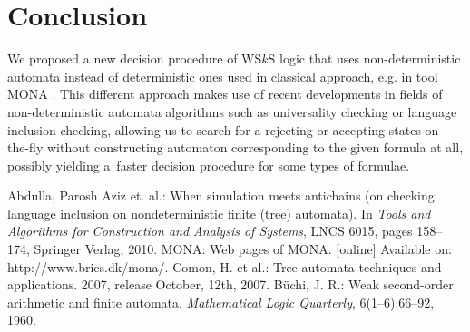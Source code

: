 \documentclass{eeict}
\begin{document}
\section{Conclusion}

We proposed a new decision procedure of WS$k$S logic that uses non-deterministic
automata instead of deterministic ones used in classical approach, e.g. in tool
MONA \cite{mona}. This different approach makes use of recent developments in
fields of non-deterministic automata algorithms such as universality checking or
language inclusion checking, allowing us to search for a rejecting or accepting
states on-the-fly without constructing automaton corresponding to the given formula at
all, possibly yielding a~faster decision procedure for some types of formulae.

\begin{thebibliography}{9}
Abdulla, Parosh Aziz et. al.: When simulation meets
antichains (on checking language inclusion on nondeterministic finite (tree) automata). In
  \emph{Tools and Algorithms for Construction and Analysis of Systems}, LNCS
  6015, pages 158--174, Springer Verlag, 2010.
  MONA:
  Web pages of MONA.
  [online] Available on:
  http://www.brics.dk/mona/.
  Comon, H. et al.: Tree automata techniques and applications.
  2007, release October, 12th, 2007.
  Büchi, J. R.: Weak second-order arithmetic and finite automata.
  \emph{Mathematical Logic Quarterly}, 6(1--6):66--92, 1960.
\end{thebibliography}
\end{document}
